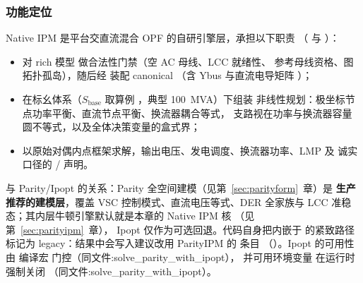 \subsubsection*{功能定位}
Native IPM 是平台交直流混合 OPF 的自研引擎层，承担以下职责
（ 与
）：
\begin{itemize}
  \item 对 rich 模型  做合法性门禁（空 AC 母线、LCC 就绪性、
        参考母线资格、图拓扑孤岛），随后经 
        装配 canonical （含 Ybus 与直流电导矩阵 ）；
  \item 在标幺体系（$S_{\mathrm{base}}$ 取算例 ，典型 100~MVA）下组装
        非线性规划：极坐标节点功率平衡、直流节点平衡、换流器耦合等式，
        支路视在功率与换流器容量圆不等式，以及全体决策变量的盒式界；
  \item 以原始对偶内点框架求解，输出电压、发电调度、换流器功率、LMP 及
        诚实口径的  /  声明。
\end{itemize}
与 Parity/Ipopt 的关系：Parity 全空间建模（见第~\ref{sec:parityform}~章）是
\textbf{生产推荐的建模层}，覆盖 VSC 控制模式、直流电压等式、DER 全家族与 LCC
准稳态；其内层牛顿引擎默认就是本章的 Native IPM 核
（见第~\ref{sec:parityipm}~章），
Ipopt 仅作为可选回退。代码自身把内嵌于  的紧致路径标记为
legacy：结果中会写入建议改用 ParityIPM 的  条目
（）。Ipopt 的可用性由
编译宏  门控（同文件:solve\_parity\_with\_ipopt），
并可用环境变量  在运行时强制关闭
（同文件:solve\_parity\_with\_ipopt）。

